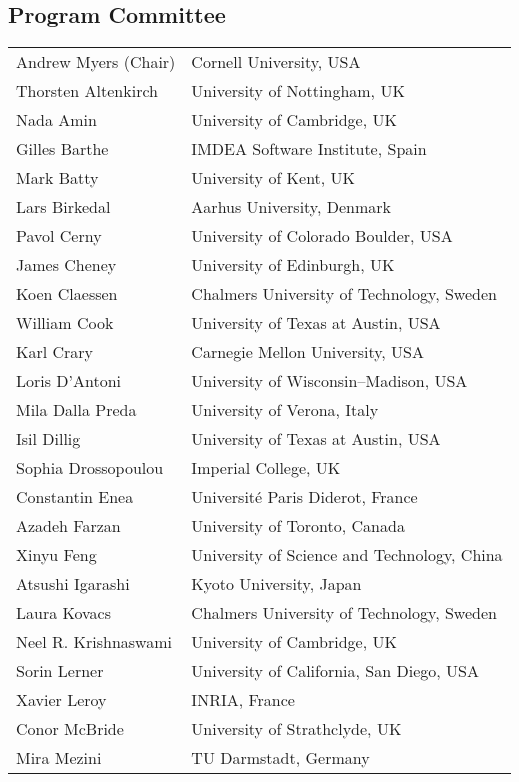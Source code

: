 \subsection*{\sffamily Program Committee}

\begin{tabular}{@{}p{\namewidth}l@{}}
Andrew Myers (Chair)
  & Cornell University, USA  \\
Thorsten Altenkirch
  & University of Nottingham, UK \\
Nada Amin
  & University of Cambridge, UK \\
Gilles Barthe
  & IMDEA Software Institute, Spain \\
Mark Batty
  & University of Kent, UK \\
Lars Birkedal
  & Aarhus University, Denmark \\
Pavol Cerny
  & University of Colorado Boulder, USA \\
James Cheney
  & University of Edinburgh, UK \\
Koen Claessen
  & Chalmers University of Technology, Sweden \\
William Cook
  & University of Texas at Austin, USA \\
Karl Crary
  & Carnegie Mellon University, USA \\
Loris D'Antoni
  & University of Wisconsin–Madison, USA \\
Mila Dalla Preda
  & University of Verona, Italy \\
Isil Dillig
  & University of Texas at Austin, USA \\
Sophia Drossopoulou
  & Imperial College, UK \\
Constantin Enea
  & Université Paris Diderot, France \\
Azadeh Farzan
  & University of Toronto, Canada \\
Xinyu Feng
  & University of Science and Technology, China \\
Atsushi Igarashi
  & Kyoto University, Japan \\
Laura Kovacs
  & Chalmers University of Technology, Sweden \\
Neel R. Krishnaswami
  & University of Cambridge, UK \\
Sorin Lerner
  & University of California, San Diego, USA \\
Xavier Leroy
  & INRIA, France \\
Conor McBride
  & University of Strathclyde, UK \\
Mira Mezini
  & TU Darmstadt, Germany \\

\end{tabular}
